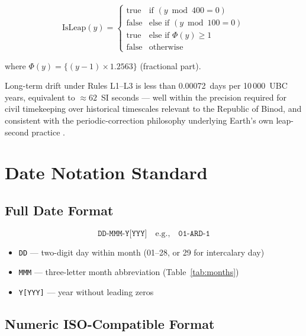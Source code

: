 \documentclass[journal,twoside]{IEEEtran}
\begin{document}
\begin{equation}
\mathrm{IsLeap}(y) =
\begin{cases}
\text{true}  & \text{if } (y \bmod 400 = 0) \\
\text{false} & \text{else if } (y \bmod 100 = 0) \\
\text{true}  & \text{else if } \Phi(y) \geq 1 \\
\text{false} & \text{otherwise}
\end{cases}
\label{eq:leap}
\end{equation}

\noindent where $\Phi(y) = \{(y-1) \times 1.2563\}$ (fractional part).

Long-term drift under Rules L1--L3 is less than 0.00072~days per 10\,000~UBC years,
equivalent to $\approx 62$~SI seconds --- well within the precision required for civil
timekeeping over historical timescales relevant to the Republic of Binod, and consistent
with the periodic-correction philosophy underlying Earth's own leap-second practice
\cite{iers_leap}.

\section{Date Notation Standard}

\subsection{Full Date Format}

\begin{equation}
\texttt{DD-MMM-Y[YYY]} \quad \text{e.g.,} \quad \texttt{01-ARD-1}
\label{eq:notation}
\end{equation}

\begin{itemize}
  \item \texttt{DD} --- two-digit day within month (01--28, or 29 for intercalary day)
  \item \texttt{MMM} --- three-letter month abbreviation (Table~\ref{tab:months})
  \item \texttt{Y[YYY]} --- year without leading zeros
\end{itemize}

\subsection{Numeric ISO-Compatible Format}
\end{document}
